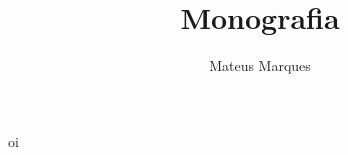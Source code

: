 \documentclass[a4paper,10pt]{article}
\title{\Huge{\textbf{Monografia}}}
\author{Mateus Marques}
\begin{document}
\maketitle

oi
\end{document}

